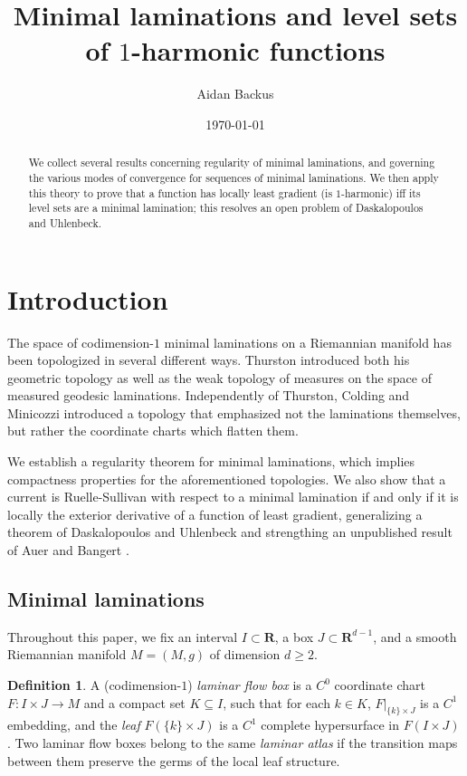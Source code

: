 \documentclass[reqno,11pt]{amsart}
\title{Minimal laminations and level sets of $1$-harmonic functions}
\author{Aidan Backus}
\date{\today}
\newcommand{\RR}{\mathbf{R}}
\newcommand{\dfn}[1]{\emph{#1}\index{#1}}
\theoremstyle{definition}
\newtheorem{definition}[theorem]{Definition}
\numberwithin{equation}{section}
\begin{document}
\begin{abstract}
We collect several results concerning regularity of minimal laminations, and governing the various modes of convergence for sequences of minimal laminations.
We then apply this theory to prove that a function has locally least gradient (is $1$-harmonic) iff its level sets are a minimal lamination; this resolves an open problem of Daskalopoulos and Uhlenbeck.
\end{abstract}

\maketitle



\section{Introduction}
The space of codimension-$1$ minimal laminations on a Riemannian manifold has been topologized in several different ways.
Thurston \cite[Chapter 8]{thurston1979geometry} introduced both his geometric topology as well as the weak topology of measures on the space of measured geodesic laminations.
Independently of Thurston, Colding and Minicozzi \cite[Appendix B]{ColdingMinicozziIV} introduced a topology that emphasized not the laminations themselves, but rather the coordinate charts which flatten them.

We establish a regularity theorem for minimal laminations, which implies compactness properties for the aforementioned topologies.
We also show that a current is Ruelle-Sullivan with respect to a minimal lamination if and only if it is locally the exterior derivative of a function of least gradient, generalizing a theorem of Daskalopoulos and Uhlenbeck \cite[Theorem 6.1]{daskalopoulos2020transverse} and strengthing an unpublished result of Auer and Bangert \cite{Auer01, Auer12}.

\subsection{Minimal laminations}\label{Lams sections}
Throughout this paper, we fix an interval $I \subset \RR$, a box $J \subset \RR^{d - 1}$, and a smooth Riemannian manifold $M = (M, g)$ of dimension $d \geq 2$.

\begin{definition}
A (codimension-$1$) \dfn{laminar flow box} is a $C^0$ coordinate chart $F: I \times J \to M$ and a compact set $K \subseteq I$, such that for each $k \in K$, $F|_{\{k\} \times J}$ is a $C^1$ embedding, and the \dfn{leaf} $F(\{k\} \times J)$ is a $C^1$ complete hypersurface in $F(I \times J)$.
Two laminar flow boxes belong to the same \dfn{laminar atlas} if the transition maps between them preserve the germs of the local leaf structure.
\end{definition}
\end{document}
